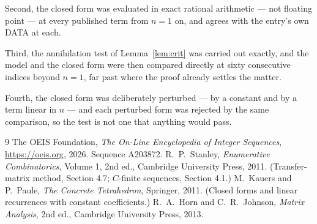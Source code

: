 \documentclass[11pt,a4paper]{article}
\theoremstyle{plain}
\theoremstyle{definition}
\begin{document}
Second, the closed form was evaluated in exact rational arithmetic --- not floating point ---
at every published term from $n=1$ on, and agrees with the entry's own DATA at each.

Third, the annihilation test of Lemma~\ref{lem:crit} was carried out exactly, and the model
and the closed form were then compared directly at sixty consecutive indices beyond
$n=1$, far past where the proof already settles the matter.

Fourth, the closed form was deliberately perturbed --- by a constant and by a term linear in
$n$ --- and each perturbed form was rejected by the same comparison, so the test is not one
that anything would pass.

\begin{thebibliography}{9}
 The OEIS Foundation, \emph{The On-Line Encyclopedia of Integer
Sequences}, \url{https://oeis.org}, 2026. Sequence A203872.
 R.~P.~Stanley, \emph{Enumerative Combinatorics}, Volume 1, 2nd ed.,
Cambridge University Press, 2011. (Transfer-matrix method, Section 4.7; $C$-finite sequences,
Section 4.1.)
 M.~Kauers and P.~Paule, \emph{The Concrete Tetrahedron}, Springer, 2011.
(Closed forms and linear recurrences with constant coefficients.)
 R.~A.~Horn and C.~R.~Johnson, \emph{Matrix Analysis}, 2nd ed., Cambridge
University Press, 2013.
\end{thebibliography}
\end{document}
